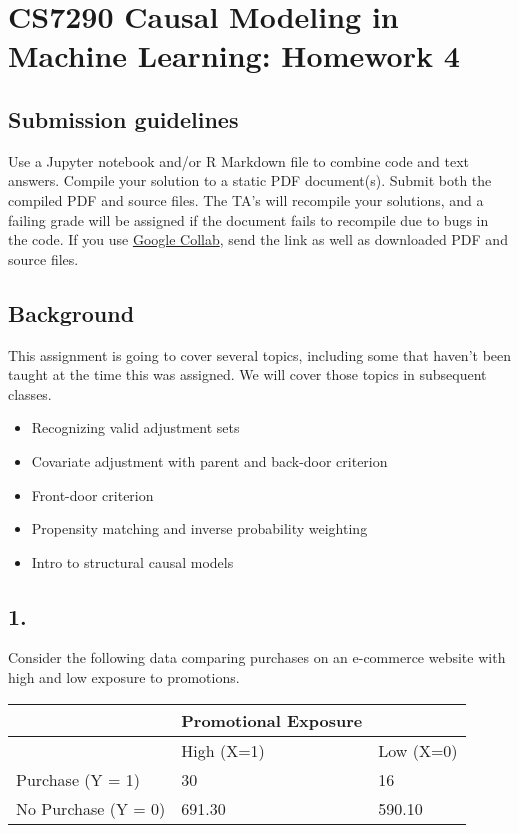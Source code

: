 \documentclass[]{article}
\title{}
\author{}
\date{5/15/2019}
\providecommand{\tightlist}{%
  \setlength{\itemsep}{0pt}\setlength{\parskip}{0pt}}
\begin{document}
\section{CS7290 Causal Modeling in Machine Learning: Homework
4}\label{cs7290-causal-modeling-in-machine-learning-homework-4}

\subsection{Submission guidelines}\label{submission-guidelines}

Use a Jupyter notebook and/or R Markdown file to combine code and text
answers. Compile your solution to a static PDF document(s). Submit both
the compiled PDF and source files. The TA's will recompile your
solutions, and a failing grade will be assigned if the document fails to
recompile due to bugs in the code. If you use
\href{https://colab.research.google.com/notebook}{Google Collab}, send
the link as well as downloaded PDF and source files.

\subsection{Background}\label{background}

This assignment is going to cover several topics, including some that
haven't been taught at the time this was assigned. We will cover those
topics in subsequent classes.

\begin{itemize}
\tightlist
\item
  Recognizing valid adjustment sets
\item
  Covariate adjustment with parent and back-door criterion
\item
  Front-door criterion
\item
  Propensity matching and inverse probability weighting
\item
  Intro to structural causal models
\end{itemize}

\subsection{1.}\label{section}

Consider the following data comparing purchases on an e-commerce website
with high and low exposure to promotions.

\begin{longtable}[]{@{}lll@{}}
\toprule
& Promotional Exposure &\tabularnewline
\midrule
\endhead
& High (X=1) & Low (X=0)\tabularnewline
Purchase (Y = 1) & 30 & 16\tabularnewline
No Purchase (Y = 0) & 691.30 & 590.10\tabularnewline
\bottomrule
\end{longtable}
\end{document}
